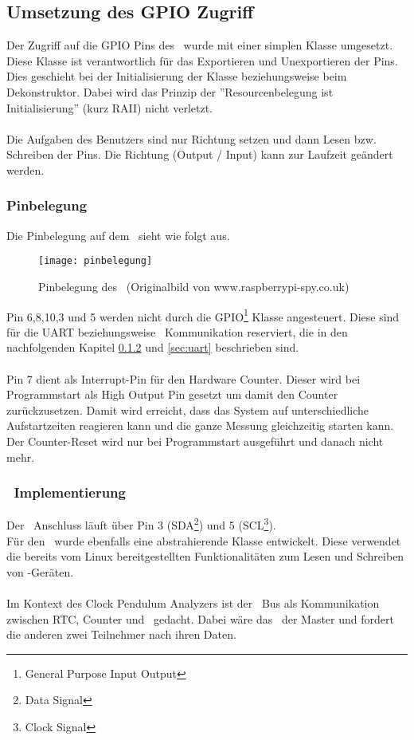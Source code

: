 \subsection{Umsetzung des GPIO Zugriff}
Der Zugriff auf die GPIO Pins des \rpi\ wurde mit einer simplen Klasse umgesetzt. Diese Klasse ist verantwortlich für das Exportieren und Unexportieren der Pins.
Dies geschieht bei der Initialisierung der Klasse beziehungsweise beim Dekonstruktor. Dabei wird das Prinzip der ''Resourcenbelegung ist Initialisierung'' (kurz RAII) nicht verletzt.\\
\\
Die Aufgaben des Benutzers sind nur Richtung setzen und dann Lesen bzw. Schreiben der Pins. Die Richtung (Output / Input) kann zur Laufzeit geändert werden.

\subsubsection{Pinbelegung}
Die Pinbelegung auf dem \rpi\ sieht wie folgt aus.
\begin{figure}[H]
    \centering
    \texttt{[image: pinbelegung]}
    \caption{Pinbelegung des \rpi\ (Originalbild von www.raspberrypi-spy.co.uk)}
\end{figure}

\noindent Pin 6,8,10,3 und 5 werden nicht durch die GPIO\footnote{General Purpose Input Output} Klasse angesteuert. Diese sind für die UART beziehungsweise \iic\ Kommunikation reserviert, die in den nachfolgenden Kapitel \ref{sec:i2c} und \ref{sec:uart} beschrieben sind.\\\\
Pin 7 dient als Interrupt-Pin für den Hardware Counter. Dieser wird bei Programmstart als High Output Pin gesetzt um damit den Counter zurückzusetzen. Damit wird erreicht, dass das System auf unterschiedliche Aufstartzeiten reagieren kann und die ganze Messung gleichzeitig starten kann. Der Counter-Reset wird nur bei Programmstart ausgeführt und danach nicht mehr.

\subsubsection{\iic\ Implementierung}\label{sec:i2c}
Der \iic\ Anschluss läuft über Pin 3 (SDA\footnote{Data Signal}) und 5 (SCL\footnote{Clock Signal}).\\
Für den \iic\ wurde ebenfalls eine abstrahierende Klasse entwickelt. Diese verwendet die bereits vom Linux bereitgestellten Funktionalitäten zum Lesen und Schreiben von \iic-Geräten.\\
\\
Im Kontext des Clock Pendulum Analyzers ist der \iic\ Bus als Kommunikation zwischen RTC, Counter und \rpi\ gedacht. 
Dabei wäre das \rpi\ der Master und fordert die anderen zwei Teilnehmer nach ihren Daten.

